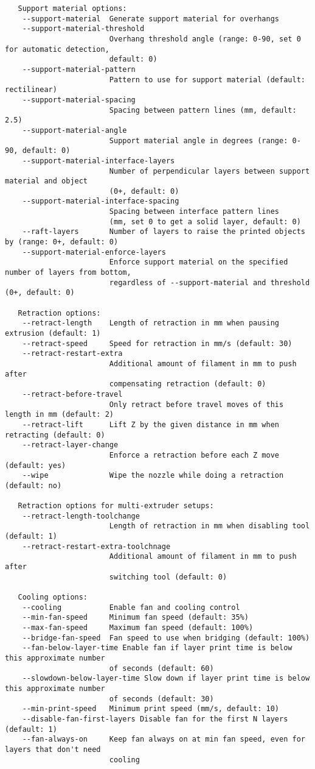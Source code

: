 \begin{verbatim}
   Support material options:
    --support-material  Generate support material for overhangs
    --support-material-threshold
                        Overhang threshold angle (range: 0-90, set 0 for automatic detection,
                        default: 0)
    --support-material-pattern
                        Pattern to use for support material (default: rectilinear)
    --support-material-spacing
                        Spacing between pattern lines (mm, default: 2.5)
    --support-material-angle
                        Support material angle in degrees (range: 0-90, default: 0)
    --support-material-interface-layers
                        Number of perpendicular layers between support material and object 
                        (0+, default: 0)
    --support-material-interface-spacing
                        Spacing between interface pattern lines 
                        (mm, set 0 to get a solid layer, default: 0)
    --raft-layers       Number of layers to raise the printed objects by (range: 0+, default: 0)
    --support-material-enforce-layers
                        Enforce support material on the specified number of layers from bottom,
                        regardless of --support-material and threshold (0+, default: 0)

   Retraction options:
    --retract-length    Length of retraction in mm when pausing extrusion (default: 1)
    --retract-speed     Speed for retraction in mm/s (default: 30)
    --retract-restart-extra
                        Additional amount of filament in mm to push after
                        compensating retraction (default: 0)
    --retract-before-travel
                        Only retract before travel moves of this length in mm (default: 2)
    --retract-lift      Lift Z by the given distance in mm when retracting (default: 0)
    --retract-layer-change
                        Enforce a retraction before each Z move (default: yes)
    --wipe              Wipe the nozzle while doing a retraction (default: no)

   Retraction options for multi-extruder setups:
    --retract-length-toolchange
                        Length of retraction in mm when disabling tool (default: 1)
    --retract-restart-extra-toolchnage
                        Additional amount of filament in mm to push after
                        switching tool (default: 0)

   Cooling options:
    --cooling           Enable fan and cooling control
    --min-fan-speed     Minimum fan speed (default: 35%)
    --max-fan-speed     Maximum fan speed (default: 100%)
    --bridge-fan-speed  Fan speed to use when bridging (default: 100%)
    --fan-below-layer-time Enable fan if layer print time is below this approximate number
                        of seconds (default: 60)
    --slowdown-below-layer-time Slow down if layer print time is below this approximate number
                        of seconds (default: 30)
    --min-print-speed   Minimum print speed (mm/s, default: 10)
    --disable-fan-first-layers Disable fan for the first N layers (default: 1)
    --fan-always-on     Keep fan always on at min fan speed, even for layers that don't need
                        cooling


\end{verbatim}
